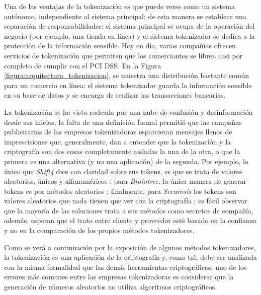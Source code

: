 Una de las ventajas de la tokenización es que puede verse como un sistema
autónomo, independiente al sistema principal; de esta manera se establece una
separación de responsabilidades: el sistema principal se ocupa de la operación
del negocio (por ejemplo, una tienda en línea) y el sistema tokenizador se
dedica a la protección de la información sensible. Hoy en día, varias compañías
ofrecen servicios de tokenización que permiten que los comerciantes se libren
casi por completo de cumplir con el PCI DSS. En la Figura
\ref{figura:arquitectura_tokenizacion}, se muestra una distribución bastante
común para un comercio en línea: el sistema tokenizador guarda la información
sensible en su base de datos y se encarga de realizar las transacciones
bancarias.


La tokenización se ha visto rodeada por una nube de confusión y 
desinformación desde sus inicios; la falta de una definición formal permitió
que las campañas publicitarias de las empresas tokenizadoras esparcieran
mensajes llenos de imprescisiones que, generalmente, dan a entender que la
tokenización y la criptografía son dos cosas completamente aisladas la una de la
otra, o que la primera es una alternativa (y no una aplicación) de la segunda.
Por ejemplo, lo único que \textit{Shift4} dice con claridad sobre sus tokens,
es que se trata de valores aleatorios, únicos y alfanuméricos \cite{shif4_uno};
para \textit{Braintree}, la única manera de generar tokens es por métodos
aleatorios \cite{braintree_uno}; finalmente, para \textit{Securosis} los tokens
son valores aleatorios que nada tienen que ver con la criptografía
\cite{securosis}; es fácil observar que la mayoría de las soluciones trata a
sus métodos como secretos de compañía, además, esperan que el trato entre
cliente y proveedor esté basado en la confianza y no en la comparación de los
propios métodos tokenizadores.


Como se verá a continuación por la exposición de algunos métodos tokenizadores,
la tokenización es una aplicación de la criptografía y, como tal, debe ser
analizada con la misma formalidad que las demás herramientas criptográficas; uno
de los errores más comunes entre las empresas tokenizadoras es considerar que
la generación de números aleatorios no utiliza algoritmos criptográficos.

